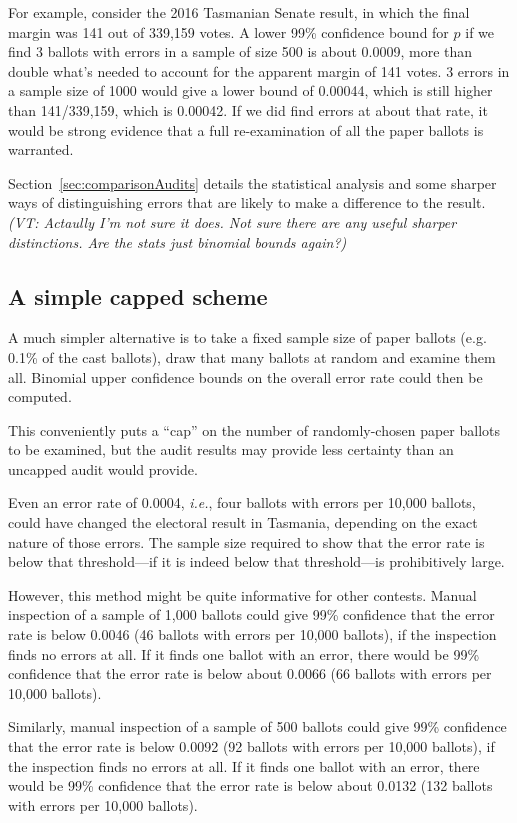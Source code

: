\documentclass[10pt,a4paper]{article}
\newcommand{\VTNote}[1]{{\it(VT: #1)}}
\begin{document}
For example, consider the 2016 Tasmanian Senate result, in which the final margin was 141 out of 339,159 votes.  A lower 99\% confidence bound for $p$ if we find 3 ballots with errors in a sample of size 500 is about 0.0009, more than double
what's needed to account for the apparent margin of 141 votes. 3 errors in a sample size of 1000 would give a lower bound of 0.00044, which is still higher than
141/339,159, which is 0.00042.  If we did find errors at about that rate, it would be strong evidence that a full re-examination of all the paper ballots is warranted.

Section~\ref{sec:comparisonAudits} details the statistical analysis and some sharper ways of distinguishing errors that are likely to make a difference to the result.  \VTNote{Actaully I'm not sure it does.  Not sure there are any useful sharper distinctions.  Are the stats just binomial bounds again?}

\subsection{A simple capped scheme}
A much simpler alternative is to
take a fixed sample size of paper ballots (e.g. 0.1\% of the cast ballots), draw that
many ballots at random and examine them all.
Binomial upper confidence bounds on the overall error rate could then be computed.  

This conveniently puts a ``cap'' on the number of randomly-chosen 
paper ballots to be examined, but 
the audit results may provide less certainty than an uncapped
audit would provide.

Even an error rate of 0.0004, {\it i.e.}, four ballots with errors per 10,000 ballots, could have changed the electoral result in Tasmania, depending on the exact nature of those errors. The sample size required to show that the error rate is below that threshold---if it is indeed below that threshold---is prohibitively large. 

However, this method might be quite informative for other contests.   Manual inspection of a sample of 1,000 ballots could give 99\% confidence that the error rate is below 0.0046 (46 ballots with errors per 10,000 ballots), if the inspection finds no errors at all. If it finds one ballot with an error, there would be 99\% confidence that the error rate is below about 0.0066 (66 ballots with errors per 10,000 ballots).

Similarly, manual inspection of a sample of 500 ballots could give 99\% confidence that the error rate is below 0.0092 (92 ballots with errors per 10,000 ballots), if the inspection finds no errors at all. If it finds one ballot with an error, there would be 99\% confidence that the error rate is below about 0.0132 (132 ballots with errors per 10,000 ballots).
\end{document}
